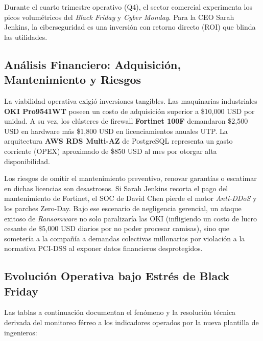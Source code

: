 \documentclass[11pt,a4paper]{article}
\begin{document}
Durante el cuarto trimestre operativo (Q4), el sector comercial experimenta los picos volumétricos del \textit{Black Friday} y \textit{Cyber Monday}. Para la CEO Sarah Jenkins, la ciberseguridad es una inversión con retorno directo (ROI) que blinda las utilidades. 

\subsection{Análisis Financiero: Adquisición, Mantenimiento y Riesgos}
La viabilidad operativa exigió inversiones tangibles. Las maquinarias industriales \textbf{OKI Pro9541WT} poseen un costo de adquisición superior a \$10,000 USD por unidad. A su vez, los clústeres de firewall \textbf{Fortinet 100F} demandaron \$2,500 USD en hardware más \$1,800 USD en licenciamientos anuales UTP. La arquitectura \textbf{AWS RDS Multi-AZ} de PostgreSQL representa un gasto corriente (OPEX) aproximado de \$850 USD al mes por otorgar alta disponibilidad. 

Los riesgos de omitir el mantenimiento preventivo, renovar garantías o escatimar en dichas licencias son desastrosos. Si Sarah Jenkins recorta el pago del mantenimiento de Fortinet, el SOC de David Chen pierde el motor \textit{Anti-DDoS} y los parches Zero-Day. Bajo ese escenario de negligencia gerencial, un ataque exitoso de \textit{Ransomware} no solo paralizaría las OKI (infligiendo un costo de lucro cesante de \$5,000 USD diarios por no poder procesar camisas), sino que sometería a la compañía a demandas colectivas millonarias por violación a la normativa PCI-DSS al exponer datos financieros desprotegidos.

\subsection{Evolución Operativa bajo Estrés de Black Friday}
Las tablas a continuación documentan el fenómeno y la resolución técnica derivada del monitoreo férreo a los indicadores operados por la nueva plantilla de ingenieros:
\end{document}
